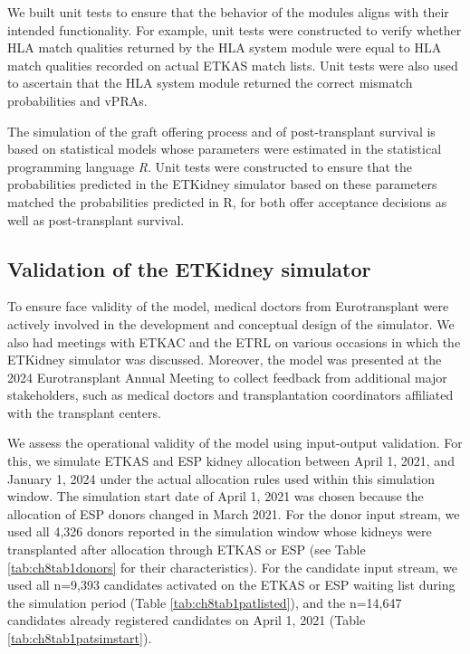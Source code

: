 \documentclass[11pt,twoside,]{book}
\begin{document}
We built unit tests to ensure that the behavior of the modules aligns
with their intended functionality. For example, unit tests were
constructed to verify whether HLA match qualities returned by the HLA
system module were equal to HLA match qualities recorded on actual ETKAS match lists.
Unit tests were also used to ascertain that the HLA system module
returned the correct mismatch probabilities and vPRAs.

The simulation of the graft offering process and of post-transplant survival
is based on statistical models whose parameters were estimated in the statistical
programming language \emph{R}. Unit tests were constructed to ensure that the
probabilities predicted in the ETKidney simulator based on these parameters matched
the probabilities predicted in R, for both offer acceptance
decisions as well as post-transplant survival.
\vfill
\newpage

\subsection{Validation of the ETKidney simulator}\label{sec:etkidneyvalidation}

To ensure face validity of the model, medical doctors from
Eurotransplant were actively involved in the development and conceptual
design of the simulator. We also had meetings with ETKAC and the ETRL on
various occasions in which the ETKidney simulator was discussed. Moreover,
the model was presented at the 2024 Eurotransplant Annual Meeting to
collect feedback from additional major stakeholders,
such as medical doctors and transplantation coordinators affiliated with the
transplant centers.

We assess the operational validity of the model using input-output validation.
For this, we simulate ETKAS and ESP kidney
allocation between April 1, 2021, and January 1, 2024 under the actual allocation
rules used within this simulation window. The simulation start date of April 1, 2021
was chosen because the allocation of ESP donors changed in March 2021.
For the donor input stream, we
used all 4,326 donors reported in the simulation window
whose kidneys were transplanted after allocation through ETKAS or ESP (see Table \ref{tab:ch8tab1donors}
for their characteristics). For the candidate input stream, we used all
n=9,393 candidates activated on the ETKAS or ESP waiting list during the
simulation period (Table \ref{tab:ch8tab1patlisted}), and the n=14,647
candidates already registered candidates on April 1, 2021
(Table \ref{tab:ch8tab1patsimstart}).
\end{document}

